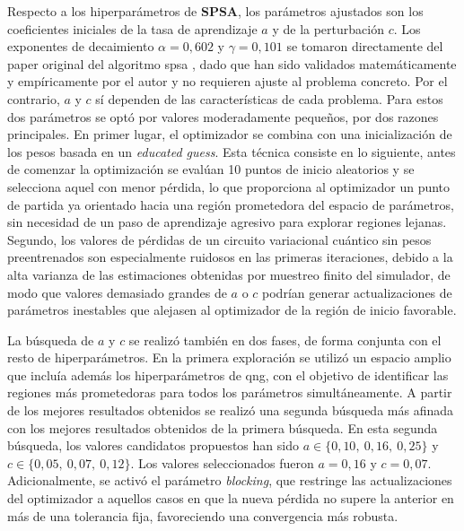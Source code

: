 Respecto a los hiperparámetros de \textbf{SPSA}, los parámetros ajustados son los coeficientes iniciales de la tasa de aprendizaje $a$ y de la perturbación $c$. Los exponentes de decaimiento $\alpha = 0{,}602$ y $\gamma = 0{,}101$ se tomaron directamente del paper original del algoritmo \gls{spsa} \cite{spall_spsa_1998}, dado que han sido validados matemáticamente y empíricamente por el autor y no requieren ajuste al problema concreto. Por el contrario, $a$ y $c$ sí dependen de las características de cada problema. Para estos dos parámetros se optó por valores moderadamente pequeños, por dos razones principales. En primer lugar, el optimizador se combina con una inicialización de los pesos basada en un \textit{educated guess}. Esta técnica consiste en lo siguiente, antes de comenzar la optimización se evalúan 10 puntos de inicio aleatorios y se selecciona aquel con menor pérdida, lo que proporciona al optimizador un punto de partida ya orientado hacia una región prometedora del espacio de parámetros, sin necesidad de un paso de aprendizaje agresivo para explorar regiones lejanas. Segundo, los valores de pérdidas de un circuito variacional cuántico sin pesos preentrenados son especialmente ruidosos en las primeras iteraciones, debido a la alta varianza de las estimaciones obtenidas por muestreo finito del simulador, de modo que valores demasiado grandes de $a$ o $c$ podrían generar actualizaciones de parámetros inestables que alejasen al optimizador de la región de inicio favorable.

La búsqueda de $a$ y $c$ se realizó también en dos fases, de forma conjunta con el resto de hiperparámetros. En la primera exploración se utilizó un espacio amplio que incluía además los hiperparámetros de \gls{qng}, con el objetivo de identificar las regiones más prometedoras para todos los parámetros simultáneamente. A partir de los mejores resultados obtenidos se realizó una segunda búsqueda más afinada con los mejores resultados obtenidos de la primera búsqueda. En esta segunda búsqueda, los valores candidatos propuestos han sido $a \in \{0{,}10,\ 0{,}16,\ 0{,}25\}$ y $c \in \{0{,}05,\ 0{,}07,\ 0{,}12\}$. Los valores seleccionados fueron $a = 0{,}16$ y $c = 0{,}07$. Adicionalmente, se activó el parámetro \textit{blocking}, que restringe las actualizaciones del optimizador a aquellos casos en que la nueva pérdida no supere la anterior en más de una tolerancia fija, favoreciendo una convergencia más robusta.

